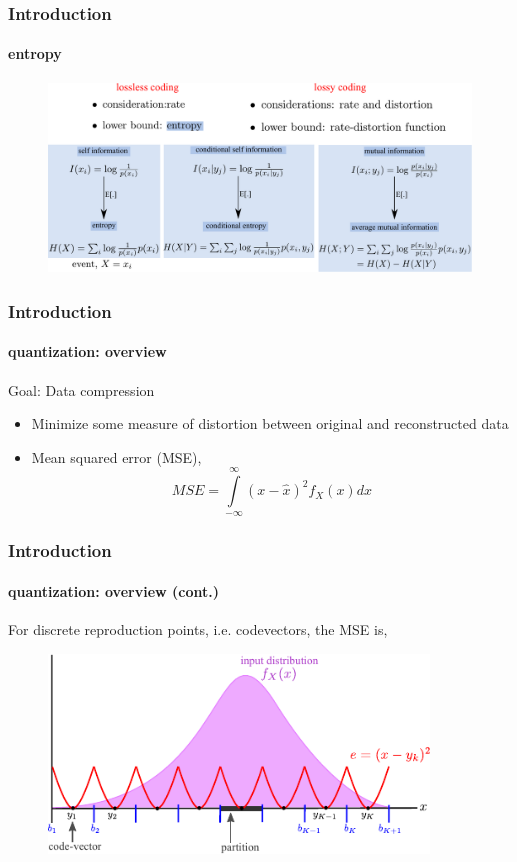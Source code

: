 \begin{frame}[plain]
\frametitle{Introduction}
\framesubtitle{entropy}
\logoCSIPCPL\mypagenum
	\begin{changemargin}{-1.3in}{0in}
		\begin{figure}				
			\includegraphics[width=1.3\textwidth]{figs/IT_entropy.pdf}
		\end{figure}
	\end{changemargin}
\end{frame}




\begin{frame}
\frametitle{Introduction}
\framesubtitle{quantization: overview}
\logoCSIPCPL\mypagenum
	{\color{red} Goal: } Data compression
	\begin{itemize}
		\item Minimize some measure of distortion between original and reconstructed data		
		\item Mean squared error (MSE),
			\begin{equation*}
				MSE = \int\limits_{-\infty}^\infty(x - \hat{x})^2f_X(x)dx
			\end{equation*}
	\end{itemize}
\end{frame}


\begin{frame}
\frametitle{Introduction}
\framesubtitle{quantization: overview (cont.)}
\logoCSIPCPL\mypagenum
	For discrete reproduction points, i.e. codevectors, the MSE is,
	\begin{figure}				
		\includegraphics[width=0.9\textwidth]{figs/Quantization_MSE.pdf}
	\end{figure}
\end{frame}



